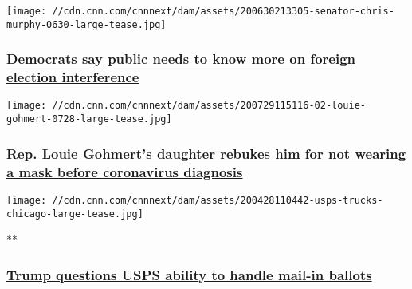 \href{/2020/08/03/politics/foreign-election-interference-senate/index.html}{}

\texttt{[image: //cdn.cnn.com/cnnnext/dam/assets/200630213305-senator-chris-murphy-0630-large-tease.jpg]}

\hypertarget{democrats-say-public-needs-to-know-more-on-foreign-election-interference}{%
\subsubsection{\texorpdfstring{\href{/2020/08/03/politics/foreign-election-interference-senate/index.html}{Democrats
say public needs to know more on foreign election
interference}}{Democrats say public needs to know more on foreign election interference}}\label{democrats-say-public-needs-to-know-more-on-foreign-election-interference}}

\href{/2020/08/03/politics/louie-gohmert-daughter-masks-coronavirus/index.html}{}

\texttt{[image: //cdn.cnn.com/cnnnext/dam/assets/200729115116-02-louie-gohmert-0728-large-tease.jpg]}

\hypertarget{rep-louie-gohmerts-daughter-rebukes-him-for-not-wearing-a-mask-before-coronavirus-diagnosis}{%
\subsubsection{\texorpdfstring{\href{/2020/08/03/politics/louie-gohmert-daughter-masks-coronavirus/index.html}{Rep.
Louie Gohmert's daughter rebukes him for not wearing a mask before
coronavirus
diagnosis}}{Rep. Louie Gohmert's daughter rebukes him for not wearing a mask before coronavirus diagnosis}}\label{rep-louie-gohmerts-daughter-rebukes-him-for-not-wearing-a-mask-before-coronavirus-diagnosis}}

\href{/videos/politics/2020/08/03/trump-briefing-usps-sot-acosta-bts-vpx.cnn}{}

\texttt{[image: //cdn.cnn.com/cnnnext/dam/assets/200428110442-usps-trucks-chicago-large-tease.jpg]}

**

\hypertarget{trump-questions-usps-ability-to-handle-mail-in-ballots}{%
\subsubsection{\texorpdfstring{\href{/videos/politics/2020/08/03/trump-briefing-usps-sot-acosta-bts-vpx.cnn}{Trump
questions USPS ability to handle mail-in
ballots}}{Trump questions USPS ability to handle mail-in ballots}}\label{trump-questions-usps-ability-to-handle-mail-in-ballots}}

